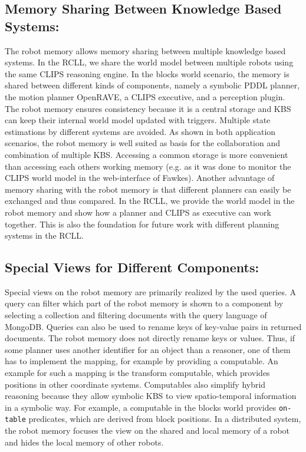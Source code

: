 \subsection{Memory Sharing Between Knowledge Based Systems:}
The robot memory allows memory sharing between multiple knowledge
based systems. In the RCLL, we share the world model between multiple
robots using the same CLIPS reasoning engine. In the blocks world
scenario, the memory is shared between different kinds of components,
namely a symbolic PDDL planner, the motion planner OpenRAVE, a CLIPS
executive, and a perception plugin. The robot memory ensures
consistency because it is a
central storage and KBS can keep their internal world model updated
with triggers. Multiple state estimations by
different systems are avoided.  As shown in both application
scenarios, the robot memory is well suited as basis for the
collaboration and combination of multiple KBS. Accessing a common
storage is more convenient than accessing each others working memory
(e.g. as it was done to monitor the CLIPS world model in the
web-interface of Fawkes).  Another advantage of memory sharing with the
robot memory is that different planners can easily be exchanged and
thus compared. In the RCLL, we provide the world model in the robot
memory and show how a planner and CLIPS as executive can work
together. This is also the foundation for future work with different
planning systems in the RCLL.

\subsection{Special Views for Different Components:} 
Special views on the robot memory are
primarily realized by the used queries. A query can
filter which part of the robot memory is shown to a component by
selecting a collection and filtering documents with the query language
of MongoDB. Queries can also be used to rename keys of key-value pairs
in returned documents. The robot memory does not directly rename keys
or values. Thus, if some planner uses another identifier for an object
than a reasoner, one of them has to implement the mapping, for example
by providing a computable. An example for such a mapping is
the transform computable, which provides positions in other coordinate
systems. Computables also simplify hybrid reasoning because they allow
symbolic KBS to view spatio-temporal information in a symbolic
way. For example, a computable in the blocks world provides
\texttt{on-table} predicates, which are derived from block positions.
In a distributed system, the robot memory focuses the view on the shared
and local memory of a robot and hides the local memory of other robots. 

